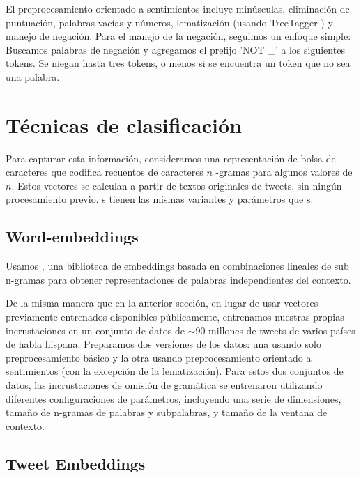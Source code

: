 El preprocesamiento orientado a sentimientos incluye minúsculas, eliminación de puntuación, palabras vacías y números, lematización (usando TreeTagger \cite{schmid95}) y manejo de negación.
Para el manejo de la negación, seguimos un enfoque simple:
Buscamos palabras de negación y agregamos el prefijo 'NOT \_' a los siguientes tokens. Se niegan hasta tres tokens, o menos si se encuentra un token que no sea una palabra.

\section{Técnicas de clasificación}

Para capturar esta información, consideramos una representación de bolsa de caracteres que codifica recuentos de caracteres $n$ -gramas para algunos valores de $ n $. Estos vectores se calculan a partir de textos originales de tweets, sin ningún procesamiento previo. \boc {} s tienen las mismas variantes y parámetros que \bow {} s.


\subsection {Word-embeddings}

Usamos \fasttext{}, una biblioteca de embeddings basada en combinaciones lineales de sub n-gramas \cite{bojanowski16} para obtener representaciones de palabras independientes del contexto.


De la misma manera que en la anterior sección, en lugar de usar vectores previamente entrenados disponibles públicamente, entrenamos nuestras propias incrustaciones en un conjunto de datos de $ \sim90 $ millones de tweets de varios países de habla hispana.
Preparamos dos versiones de los datos: una usando solo preprocesamiento básico y la otra usando preprocesamiento orientado a sentimientos (con la excepción de la lematización). Para estos dos conjuntos de datos, las incrustaciones de omisión de gramática se entrenaron utilizando diferentes configuraciones de parámetros, incluyendo una serie de dimensiones, tamaño de n-gramas de palabras y subpalabras, y tamaño de la ventana de contexto.

\subsection{Tweet Embeddings}
\label{sec:sif}


